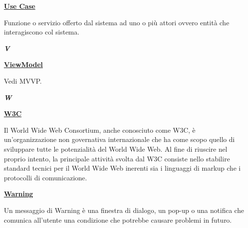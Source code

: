 \bigskip
\begin{addmargin}[0em]{0em}
	\textbf{\underline{Use Case}} 
\end{addmargin}

\medskip
\begin{addmargin}[5em]{1em}
Funzione o servizio offerto dal sistema ad uno o più attori ovvero entità che interagiscono col sistema.
\end{addmargin}	

\newpage

\cleardoublepage
{}
{}
\noindent\hrulefill\hspace{4mm}\textbf{\textsl{\Huge{V}}}\hspace{4mm}\hrulefill
\vspace*{2\bigskipamount}

\begin{addmargin}[0em]{0em}
	\textbf{\underline{ViewModel}}
\end{addmargin}

\medskip
\begin{addmargin}[5em]{1em}
Vedi MVVP.
\end{addmargin}

\cleardoublepage
{}
{}
\noindent\hrulefill\hspace{4mm}\textbf{\textsl{\Huge{W}}}\hspace{4mm}\hrulefill
\vspace*{2\bigskipamount}

\begin{addmargin}[0em]{0em}
	\textbf{\underline{W3C}}
\end{addmargin}

\medskip
\begin{addmargin}[5em]{1em}
Il World Wide Web Consortium, anche conosciuto come W3C, è un'organizzazione non governativa internazionale che ha come scopo quello di sviluppare tutte le potenzialità del World Wide Web. Al fine di riuscire nel proprio intento, la principale attività svolta dal W3C consiste nello stabilire standard tecnici per il World Wide Web inerenti sia i linguaggi di markup che i protocolli di comunicazione.
\end{addmargin}

\bigskip
\begin{addmargin}[0em]{0em}
	\textbf{\underline{Warning}}
\end{addmargin} 

\medskip
\begin{addmargin}[5em]{1em}
Un messaggio di Warning è una finestra di dialogo, un pop-up o una notifica che comunica all'utente una condizione che potrebbe causare problemi in futuro.
\end{addmargin}
	
